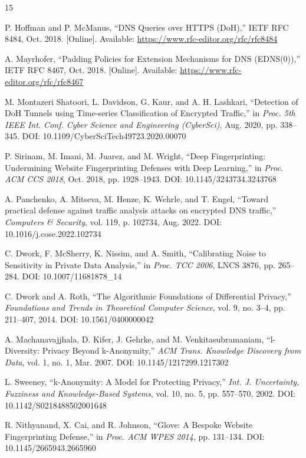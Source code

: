 \documentclass[conference]{IEEEtran}
\begin{document}
\begin{thebibliography}{15}

P. Hoffman and P. McManus, ``DNS Queries over HTTPS (DoH),'' IETF RFC 8484, Oct. 2018. [Online]. Available: \url{https://www.rfc-editor.org/rfc/rfc8484}

A. Mayrhofer, ``Padding Policies for Extension Mechanisms for DNS (EDNS(0)),'' IETF RFC 8467, Oct. 2018. [Online]. Available: \url{https://www.rfc-editor.org/rfc/rfc8467}

M. Montazeri Shatoori, L. Davidson, G. Kaur, and A. H. Lashkari, ``Detection of DoH Tunnels using Time-series Classification of Encrypted Traffic,'' in \emph{Proc. 5th IEEE Int. Conf. Cyber Science and Engineering (CyberSci)}, Aug. 2020, pp. 338--345. DOI: 10.1109/CyberSciTech49723.2020.00070

P. Sirinam, M. Imani, M. Juarez, and M. Wright, ``Deep Fingerprinting: Undermining Website Fingerprinting Defenses with Deep Learning,'' in \emph{Proc. ACM CCS 2018}, Oct. 2018, pp. 1928--1943. DOI: 10.1145/3243734.3243768

A. Panchenko, A. Mitseva, M. Henze, K. Wehrle, and T. Engel, ``Toward practical defense against traffic analysis attacks on encrypted DNS traffic,'' \emph{Computers \& Security}, vol. 119, p. 102734, Aug. 2022. DOI: 10.1016/j.cose.2022.102734

C. Dwork, F. McSherry, K. Nissim, and A. Smith, ``Calibrating Noise to Sensitivity in Private Data Analysis,'' in \emph{Proc. TCC 2006}, LNCS 3876, pp. 265--284. DOI: 10.1007/11681878\_14

C. Dwork and A. Roth, ``The Algorithmic Foundations of Differential Privacy,'' \emph{Foundations and Trends in Theoretical Computer Science}, vol. 9, no. 3--4, pp. 211--407, 2014. DOI: 10.1561/0400000042

A. Machanavajjhala, D. Kifer, J. Gehrke, and M. Venkitasubramaniam, ``l-Diversity: Privacy Beyond k-Anonymity,'' \emph{ACM Trans. Knowledge Discovery from Data}, vol. 1, no. 1, Mar. 2007. DOI: 10.1145/1217299.1217302

L. Sweeney, ``k-Anonymity: A Model for Protecting Privacy,'' \emph{Int. J. Uncertainty, Fuzziness and Knowledge-Based Systems}, vol. 10, no. 5, pp. 557--570, 2002. DOI: 10.1142/S0218488502001648

R. Nithyanand, X. Cai, and R. Johnson, ``Glove: A Bespoke Website Fingerprinting Defense,'' in \emph{Proc. ACM WPES 2014}, pp. 131--134. DOI: 10.1145/2665943.2665960


\end{thebibliography}
\end{document}

